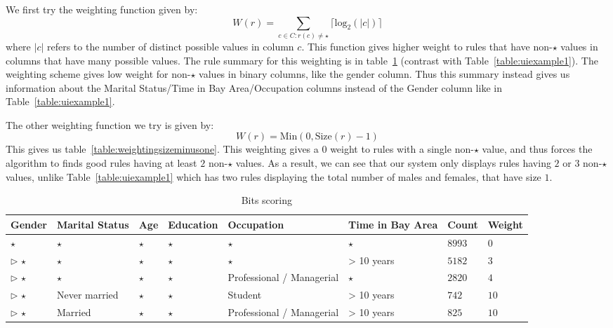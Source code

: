 We first try the weighting function given by:
$$W(r) = \sum_{c \in C : r(c) \neq \star} \lceil \text{log}_2(|c|) \rceil$$ where $|c|$ refers to the number of distinct possible values in column $c$. This function gives higher weight to rules that have non-$\star$ values in columns that have many possible values. The rule summary for this weighting is in table~\ref{table:weigtingbitwise} (contrast with Table~\ref{table:uiexample1}). The weighting scheme gives low weight for non-$\star$ values in binary columns, like the gender column. Thus this summary instead gives us information about the Marital Status/Time in Bay Area/Occupation columns instead of the Gender column like in Table~\ref{table:uiexample1}.  

The other weighting function we try is given by:
$$W(r) = \text{Min}(0, \text{Size}(r) - 1)$$
This gives us table~\ref{table:weightingsizeminusone}. This weighting gives a $0$ weight to rules with a single non-$\star$ value, and thus forces the algorithm to finds good rules having at least $2$ non-$\star$ values. As a result, we can see that our system only displays rules having $2$ or $3$ non-$\star$ values, unlike Table~\ref{table:uiexample1} which has two rules displaying the total number of males and females, that have size $1$.



\begin{table} 
\centering 
\begin{tabular}{| p{1.5cm} | p{1.5cm} | p{1.5cm} | p{1.5cm} | p{1.5cm} | p{1.5cm} | l | l |} 
\hline Gender & Marital Status & Age & Education & Occupation & Time in Bay Area & Count & Weight \\ \hline 
\cline{1-8} $\star$ & $\star$ & $\star$ & $\star$ & $\star$ & $\star$ & $8993$ & $0$ \\
\cline{1-1} \cline{2-2} \cline{3-3} \cline{4-4} \cline{5-5} \cline{6-6} \cline{7-8} $\triangleright$ $\star$ & $\star$ & $\star$ & $\star$ & $\star$ & > 10 years & $5182$ & $3$ \\
\cline{1-1} \cline{2-2} \cline{3-3} \cline{4-4} \cline{5-5} \cline{6-6} \cline{7-8} $\triangleright$ $\star$ & $\star$ & $\star$ & $\star$ & Professional / Managerial & $\star$ & $2820$ & $4$ \\
\cline{1-1} \cline{2-2} \cline{3-3} \cline{4-4} \cline{5-5} \cline{6-6} \cline{7-8} $\triangleright$ $\star$ & Never married & $\star$ & $\star$ & Student & > 10 years & $742$ & $10$ \\
\cline{1-1} \cline{2-2} \cline{3-3} \cline{4-4} \cline{5-5} \cline{6-6} \cline{7-8} $\triangleright$ $\star$ & Married & $\star$ & $\star$ & Professional / Managerial & > 10 years & $825$ & $10$ \\
\hline 
\end{tabular} 
\caption{Bits scoring\label{table:weigtingbitwise}} 
\end{table} 

